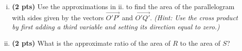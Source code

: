 \documentclass[12pt]{article}
\begin{document}
\begin{enumerate}[(a)]
\begin{enumerate}[i. ]
	\item {\bf (2 pts)} Use the approximations in ii. to find the area of the parallelogram with sides given by the vectors $\overrightarrow{O'P'}$ and $\overrightarrow{O'Q'}$.  {\it (Hint: Use the cross product by first adding a third variable and setting its direction equal to zero.)}
	\vspace{22pc}
	
	\item {\bf (2 pts)} What is the approximate ratio of the area of $R$ to the area of $S$?

	\end{enumerate}

\end{enumerate}
\end{document}
